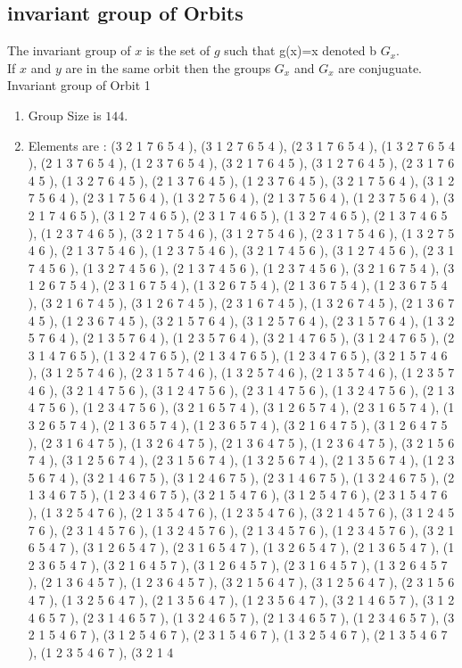 \documentclass[12pt]{article}
\begin{document}
\subsection{invariant group of Orbits}
\noindent The invariant group of $x$ is the set of $g$ such that g(x)=x denoted b $G_x$.\\
If $x$ and $y$ are in the same orbit then the groups $G_x$ and  $G_x$ are conjuguate.\\
Invariant group of Orbit 1
\begin{enumerate}
\item Group Size is $144$.
\item Elements are : (3 2 1 7 6 5 4  ), (3 1 2 7 6 5 4  ), (2 3 1 7 6 5 4  ), (1 3 2 7 6 5 4  ), (2 1 3 7 6 5 4  ), (1 2 3 7 6 5 4  ), (3 2 1 7 6 4 5  ), (3 1 2 7 6 4 5  ), (2 3 1 7 6 4 5  ), (1 3 2 7 6 4 5  ), (2 1 3 7 6 4 5  ), (1 2 3 7 6 4 5  ), (3 2 1 7 5 6 4  ), (3 1 2 7 5 6 4  ), (2 3 1 7 5 6 4  ), (1 3 2 7 5 6 4  ), (2 1 3 7 5 6 4  ), (1 2 3 7 5 6 4  ), (3 2 1 7 4 6 5  ), (3 1 2 7 4 6 5  ), (2 3 1 7 4 6 5  ), (1 3 2 7 4 6 5  ), (2 1 3 7 4 6 5  ), (1 2 3 7 4 6 5  ), (3 2 1 7 5 4 6  ), (3 1 2 7 5 4 6  ), (2 3 1 7 5 4 6  ), (1 3 2 7 5 4 6  ), (2 1 3 7 5 4 6  ), (1 2 3 7 5 4 6  ), (3 2 1 7 4 5 6  ), (3 1 2 7 4 5 6  ), (2 3 1 7 4 5 6  ), (1 3 2 7 4 5 6  ), (2 1 3 7 4 5 6  ), (1 2 3 7 4 5 6  ), (3 2 1 6 7 5 4  ), (3 1 2 6 7 5 4  ), (2 3 1 6 7 5 4  ), (1 3 2 6 7 5 4  ), (2 1 3 6 7 5 4  ), (1 2 3 6 7 5 4  ), (3 2 1 6 7 4 5  ), (3 1 2 6 7 4 5  ), (2 3 1 6 7 4 5  ), (1 3 2 6 7 4 5  ), (2 1 3 6 7 4 5  ), (1 2 3 6 7 4 5  ), (3 2 1 5 7 6 4  ), (3 1 2 5 7 6 4  ), (2 3 1 5 7 6 4  ), (1 3 2 5 7 6 4  ), (2 1 3 5 7 6 4  ), (1 2 3 5 7 6 4  ), (3 2 1 4 7 6 5  ), (3 1 2 4 7 6 5  ), (2 3 1 4 7 6 5  ), (1 3 2 4 7 6 5  ), (2 1 3 4 7 6 5  ), (1 2 3 4 7 6 5  ), (3 2 1 5 7 4 6  ), (3 1 2 5 7 4 6  ), (2 3 1 5 7 4 6  ), (1 3 2 5 7 4 6  ), (2 1 3 5 7 4 6  ), (1 2 3 5 7 4 6  ), (3 2 1 4 7 5 6  ), (3 1 2 4 7 5 6  ), (2 3 1 4 7 5 6  ), (1 3 2 4 7 5 6  ), (2 1 3 4 7 5 6  ), (1 2 3 4 7 5 6  ), (3 2 1 6 5 7 4  ), (3 1 2 6 5 7 4  ), (2 3 1 6 5 7 4  ), (1 3 2 6 5 7 4  ), (2 1 3 6 5 7 4  ), (1 2 3 6 5 7 4  ), (3 2 1 6 4 7 5  ), (3 1 2 6 4 7 5  ), (2 3 1 6 4 7 5  ), (1 3 2 6 4 7 5  ), (2 1 3 6 4 7 5  ), (1 2 3 6 4 7 5  ), (3 2 1 5 6 7 4  ), (3 1 2 5 6 7 4  ), (2 3 1 5 6 7 4  ), (1 3 2 5 6 7 4  ), (2 1 3 5 6 7 4  ), (1 2 3 5 6 7 4  ), (3 2 1 4 6 7 5  ), (3 1 2 4 6 7 5  ), (2 3 1 4 6 7 5  ), (1 3 2 4 6 7 5  ), (2 1 3 4 6 7 5  ), (1 2 3 4 6 7 5  ), (3 2 1 5 4 7 6  ), (3 1 2 5 4 7 6  ), (2 3 1 5 4 7 6  ), (1 3 2 5 4 7 6  ), (2 1 3 5 4 7 6  ), (1 2 3 5 4 7 6  ), (3 2 1 4 5 7 6  ), (3 1 2 4 5 7 6  ), (2 3 1 4 5 7 6  ), (1 3 2 4 5 7 6  ), (2 1 3 4 5 7 6  ), (1 2 3 4 5 7 6  ), (3 2 1 6 5 4 7  ), (3 1 2 6 5 4 7  ), (2 3 1 6 5 4 7  ), (1 3 2 6 5 4 7  ), (2 1 3 6 5 4 7  ), (1 2 3 6 5 4 7  ), (3 2 1 6 4 5 7  ), (3 1 2 6 4 5 7  ), (2 3 1 6 4 5 7  ), (1 3 2 6 4 5 7  ), (2 1 3 6 4 5 7  ), (1 2 3 6 4 5 7  ), (3 2 1 5 6 4 7  ), (3 1 2 5 6 4 7  ), (2 3 1 5 6 4 7  ), (1 3 2 5 6 4 7  ), (2 1 3 5 6 4 7  ), (1 2 3 5 6 4 7  ), (3 2 1 4 6 5 7  ), (3 1 2 4 6 5 7  ), (2 3 1 4 6 5 7  ), (1 3 2 4 6 5 7  ), (2 1 3 4 6 5 7  ), (1 2 3 4 6 5 7  ), (3 2 1 5 4 6 7  ), (3 1 2 5 4 6 7  ), (2 3 1 5 4 6 7  ), (1 3 2 5 4 6 7  ), (2 1 3 5 4 6 7  ), (1 2 3 5 4 6 7  ), (3 2 1 4 
\end{enumerate}
\end{document}
